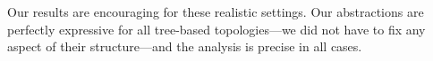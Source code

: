 \documentclass[numbers, 10pt, preprint]{sigplanconf}
\newcommand{\EG}{\emph{e.g.}}
\newcommand{\para}[1]{\paragraph*{\textbf{#1}}}
\begin{document}
Our results are encouraging for these realistic settings. Our abstractions are perfectly expressive for all tree-based topologies---we did not have to fix any aspect of their structure---and the analysis is precise in all cases.



%
\end{document}
